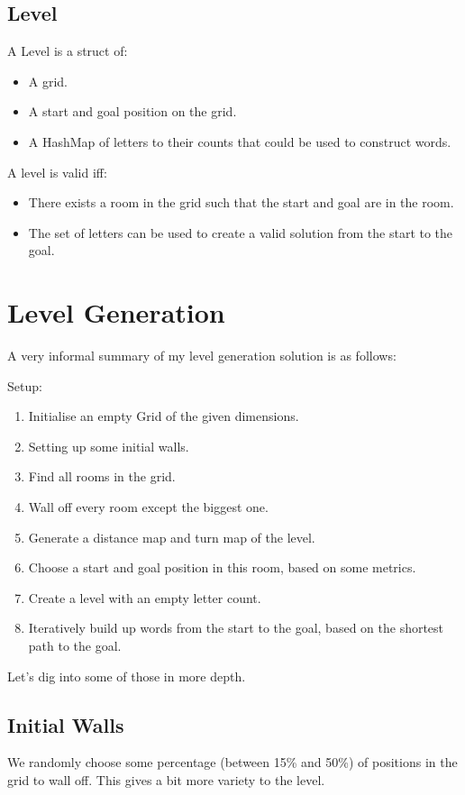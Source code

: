 \documentclass{article}
\begin{document}
\subsection*{Level}
A Level is a struct of:
\begin{itemize}
  \item A grid.
  \item A start and goal position on the grid.
  \item A HashMap of letters to their counts that could be used to construct words.
\end{itemize}

A level is valid iff:
\begin{itemize}
  \item There exists a room in the grid such that the start and goal are in the room.
  \item The set of letters can be used to create a valid solution from the start to the goal.
\end{itemize}


\section{Level Generation}
A very informal summary of my level generation solution is as follows:

Setup:
\begin{enumerate}
  \item Initialise an empty Grid of the given dimensions.
  \item Setting up some initial walls.
  \item Find all rooms in the grid.
  \item Wall off every room except the biggest one.
  \item Generate a distance map and turn map of the level.
  \item Choose a start and goal position in this room, based on some metrics.
  \item Create a level with an empty letter count.
  \item Iteratively build up words from the start to the goal, based on the
    shortest path to the goal.
\end{enumerate}

Let's dig into some of those in more depth.

\subsection{Initial Walls}
We randomly choose some percentage (between 15\% and 50\%) of positions in the grid
to wall off. This gives a bit more variety to the level. 
\end{document}
